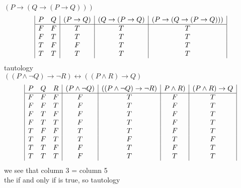 \documentclass[a4paper,12pt]{article}
\begin{document}
$(P \rightarrow (Q \rightarrow (P \rightarrow Q)))$\\
\begin{displaymath}
\begin {array} {|c c |c|c|c|}
P & Q & (P \rightarrow Q) & (Q \rightarrow (P \rightarrow Q) 
&(P \rightarrow (Q \rightarrow (P \rightarrow Q)))\\
\hline
F & F & T & T & T \\
F & T & T & T & T \\
T & F & F & T & T \\
T & T & T & T & T \\

\end{array}
\end{displaymath}
tautology\\

$((P \wedge \lnot Q) \rightarrow \lnot R) \leftrightarrow ((P \wedge R) \rightarrow Q)$\\
\begin{displaymath}
\begin {array} {|c c c|c|c|c|c|c|c|}
P & Q & R & (P \wedge \lnot Q) & 
((P \wedge \lnot Q) \rightarrow \lnot R)&
P \wedge R) &
(P \wedge R) \rightarrow Q\\
\hline
F & F & F & F & T & F & T\\
F & F & T & F & T & F & T\\
F & T & F & F & T & F & T\\
F & T & T & F & T & F & T\\
T & F & F & T & T & F & T\\
T & F & T & T & F & T & F\\
T & T & F & F & T & F & T\\
T & T & T & F & T & T & T\\
\end{array}
\end{displaymath}
we see that column 3 = column 5\\
the if and only if is true, so tautology\\
\end{document}
